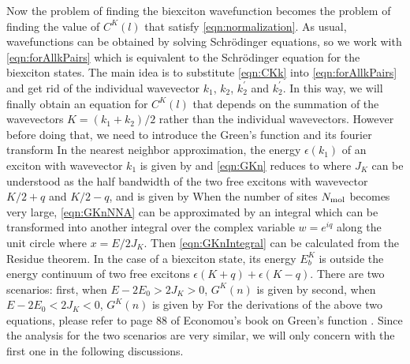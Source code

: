 Now the problem of finding the biexciton wavefunction becomes the problem of finding the value of $C^{K}(l)$ that 
satisfy \autoref{eqn:normalization}. As usual, wavefunctions can be obtained by solving Schr{\" o}dinger equations, so
 we work with \autoref{eqn:forAllkPairs} which is equivalent to the Schr{\" o}dinger equation for the biexciton states. 
The main idea is to substitute \autoref{eqn:CKk} into \autoref{eqn:forAllkPairs} and get rid of the individual 
wavevector $k_1$, $k_2$, $k_2^{'}$ and $k_2^{'}$. In this way, we will finally obtain an equation for $C^{K}(l)$ that
 depends on the summation of the wavevectors $K = (k_1 + k_2)/2$ rather than the individual wavevectors. However 
before doing that, we need to introduce the Green's function
and its fourier transform
In the nearest neighbor approximation,  the energy $\epsilon(k_1)$ of an exciton with wavevector $k_1$ is given by
and \autoref{eqn:GKn} reduces to
where $J_{K}$ can be understood as the half bandwidth of the two free excitons with wavevector $K/2 + q$ and $K/2-q$,
 and is given by
When the number of sites $N_{\rm mol}$ becomes very large, \autoref{eqn:GKnNNA} can be approximated by an
 integral
which can be transformed into another integral over the complex variable $w=e^{iq}$ along the unit circle
where $x = E/2J_K $. Then \autoref{eqn:GKnIntegral} can be calculated from the Residue theorem. In the case of a
 biexciton state, its energy $E^{K}_{b}$ is outside the energy continuum of two free excitons 
$\epsilon(K+q) + \epsilon(K-q)$. There are  two scenarios:  first, when $E - 2 E_0 > 2 J_K >0$, $G^{K}(n)$ is given by
second, when $E - 2 E_0 < 2 J_K < 0$, $G^{K}(n)$ is given by
For the derivations of the above two equations, please refer to page 88 of Economou's book on Green's function
 \cite{economou2006}. Since the analysis for the two  scenarios are very similar, we will only concern with the first one
in the following discussions. 

